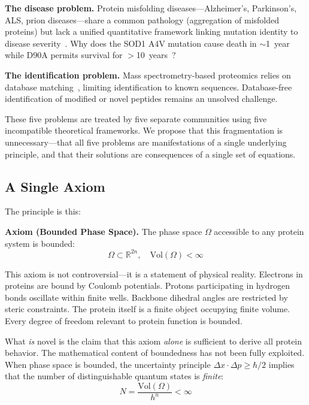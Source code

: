 \documentclass[aps,prx,superscriptaddress,twocolumn,10pt,a4paper,longbibliography,preprint]{revtex4-2}
\theoremstyle{definition}
\theoremstyle{remark}
\begin{document}
\textbf{The disease problem.} Protein misfolding diseases---Alzheimer's, Parkinson's, ALS, prion diseases---share a common pathology (aggregation of misfolded proteins) but lack a unified quantitative framework linking mutation identity to disease severity~\cite{Chiti2006, Dobson2003}. Why does the SOD1 A4V mutation cause death in $\sim$1~year while D90A permits survival for $>$10~years~\cite{Rosen1993}?

\textbf{The identification problem.} Mass spectrometry-based proteomics relies on database matching~\cite{Eng1994, Perkins1999}, limiting identification to known sequences. Database-free identification of modified or novel peptides remains an unsolved challenge.

These five problems are treated by five separate communities using five incompatible theoretical frameworks. We propose that this fragmentation is unnecessary---that all five problems are manifestations of a single underlying principle, and that their solutions are consequences of a single set of equations.

\subsection{A Single Axiom}

The principle is this:

\begin{mdframed}[linewidth=1pt, linecolor=black, backgroundcolor=gray!5]
\textbf{Axiom (Bounded Phase Space).} The phase space $\Omega$ accessible to any protein system is bounded:
\begin{equation}
\Omega \subset \mathbb{R}^{2n}, \quad \mathrm{Vol}(\Omega) < \infty
\label{eq:axiom}
\end{equation}
\end{mdframed}

This axiom is not controversial---it is a statement of physical reality. Electrons in proteins are bound by Coulomb potentials. Protons participating in hydrogen bonds oscillate within finite wells. Backbone dihedral angles are restricted by steric constraints. The protein itself is a finite object occupying finite volume. Every degree of freedom relevant to protein function is bounded.

What \emph{is} novel is the claim that this axiom \emph{alone} is sufficient to derive all protein behavior. The mathematical content of boundedness has not been fully exploited. When phase space is bounded, the uncertainty principle $\Delta x \cdot \Delta p \geq \hbar/2$ implies that the number of distinguishable quantum states is \emph{finite}:
\begin{equation}
N = \frac{\mathrm{Vol}(\Omega)}{h^n} < \infty
\label{eq:finite_states}
\end{equation}
\end{document}
